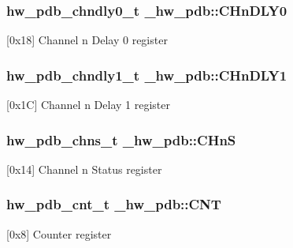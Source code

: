 \subsubsection[{\texorpdfstring{C\+Hn\+D\+L\+Y0}{CHnDLY0}}]{ {\bf hw\+\_\+pdb\+\_\+chndly0\+\_\+t} \+\_\+hw\+\_\+pdb\+::\+C\+Hn\+D\+L\+Y0}\hypertarget{struct__hw__pdb_abbe59362e51a6c883afa38ae4066fdde}{}\label{struct__hw__pdb_abbe59362e51a6c883afa38ae4066fdde}
\mbox{[}0x18\mbox{]} Channel n Delay 0 register 
\subsubsection[{\texorpdfstring{C\+Hn\+D\+L\+Y1}{CHnDLY1}}]{ {\bf hw\+\_\+pdb\+\_\+chndly1\+\_\+t} \+\_\+hw\+\_\+pdb\+::\+C\+Hn\+D\+L\+Y1}\hypertarget{struct__hw__pdb_a4c64a431a28839a76b5bafd3ef5ce6c8}{}\label{struct__hw__pdb_a4c64a431a28839a76b5bafd3ef5ce6c8}
\mbox{[}0x1C\mbox{]} Channel n Delay 1 register 
\subsubsection[{\texorpdfstring{C\+HnS}{CHnS}}]{ {\bf hw\+\_\+pdb\+\_\+chns\+\_\+t} \+\_\+hw\+\_\+pdb\+::\+C\+HnS}\hypertarget{struct__hw__pdb_ab64651cd96a5aaea89f5ff307e0e3f42}{}\label{struct__hw__pdb_ab64651cd96a5aaea89f5ff307e0e3f42}
\mbox{[}0x14\mbox{]} Channel n Status register 
\subsubsection[{\texorpdfstring{C\+NT}{CNT}}]{ {\bf hw\+\_\+pdb\+\_\+cnt\+\_\+t} \+\_\+hw\+\_\+pdb\+::\+C\+NT}\hypertarget{struct__hw__pdb_a42c59d9c9753d9af7e9f333ae64e36c5}{}\label{struct__hw__pdb_a42c59d9c9753d9af7e9f333ae64e36c5}
\mbox{[}0x8\mbox{]} Counter register 
